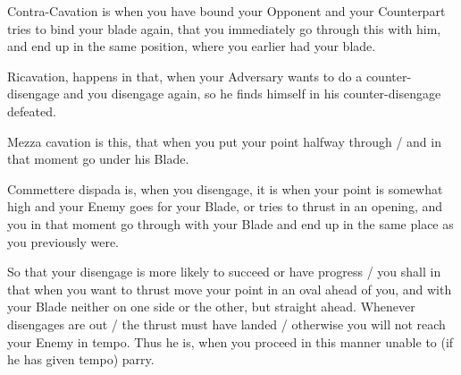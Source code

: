 \newpage


\newpage



Contra-Cavation is when you have bound your Opponent and your
Counterpart tries to bind your blade again, that you immediately go
through this with him, and end up in the same position, where you
earlier had your blade.


Ricavation, happens in that, when your Adversary wants to do a
counter-disengage and you disengage
again, so he finds himself in his counter-disengage defeated.


Mezza cavation is this, that when you put your point halfway through /
and in that moment go under his Blade.


Commettere dispada is, when you disengage, it is when your point is
somewhat high and your Enemy goes for your Blade, or tries to thrust
in an opening, and you in that moment go through with your Blade and
end up in the same place as you previously were.


So that your disengage is more likely to succeed or have progress / you
shall in that when you want to thrust move your point in an oval ahead
of you, and with your Blade neither on one side or the other, but
straight ahead. Whenever disengages are out / the thrust must have landed /
otherwise you will not reach your Enemy in tempo. Thus he is, when you
proceed in this manner unable to (if he has given tempo) parry.

